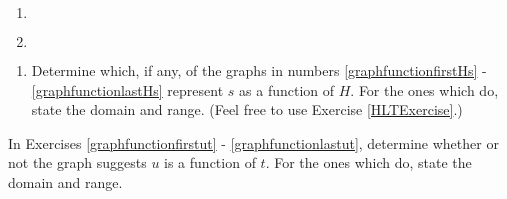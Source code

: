 \documentclass{ximera}
\begin{document}
\begin{enumerate}

\item  $~$  \label{graphfunctionfirstHs3}


 

\item  $~$ \label{graphfunctionlastHs}



\end{enumerate}


\begin{enumerate}

\item  Determine which, if any, of the graphs in numbers \ref{graphfunctionfirstHs} - \ref{graphfunctionlastHs} represent $s$ as a function of $H$.  For the ones which do, state the domain and range.   (Feel free to use Exercise \ref{HLTExercise}.)

\end{enumerate}


In Exercises \ref{graphfunctionfirstut} - \ref{graphfunctionlastut}, determine whether or not the graph suggests $u$ is a function of $t$. For the ones which do, state the domain and range. 
\end{document}

